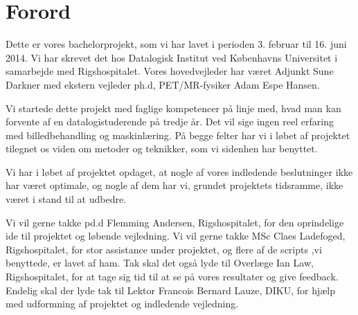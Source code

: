 \section{Forord}

Dette er vores bachelorprojekt, som vi har lavet i perioden 3.
februar til 16. juni 2014. Vi har skrevet det hos Datalogisk Institut
ved Københavns Universitet i samarbejde med Rigshospitalet. Vores
hovedvejleder har været Adjunkt Sune Darkner med ekstern vejleder ph.d,
PET/MR-fysiker Adam Espe Hansen.

Vi startede dette projekt med faglige kompetencer på linje med, hvad
man kan forvente af en datalogistuderende på tredje år. Det vil sige
ingen reel erfaring med billedbehandling og maskinlæring. På begge
felter har vi i løbet af projektet tilegnet os viden om metoder og
teknikker, som vi sidenhen har benyttet.

Vi har i løbet af projektet opdaget, at nogle af vores indledende
beslutninger ikke har været optimale, og nogle af dem har vi, grundet
projektets tidsramme, ikke været i stand til at udbedre.

Vi vil gerne takke pd.d Flemming Andersen, Rigshospitalet, for den
oprindelige ide til projektet og løbende vejledning. Vi vil gerne
takke MSc Claes Ladefoged, Rigshospitalet, for stor assistance under
projektet, og flere af de scripts ,vi benyttede, er lavet af ham. Tak skal
det også lyde til Overlæge Ian Law, Rigshospitalet, for at tage sig tid
til at se på vores resultater og give feedback. Endelig skal der lyde
tak til Lektor Francois Bernard Lauze, DIKU, for hjælp med udformning af
projektet og indledende vejledning.


